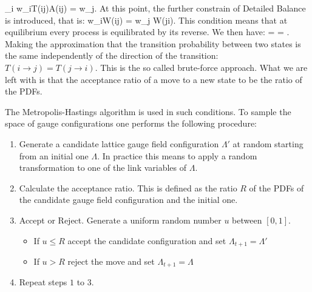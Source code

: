     \sum_i w_iT(i\rightarrow j)A(i\rightarrow j) =  w_j.
\eeq 
At this point, the further constrain of Detailed Balance \cite{robert_monte_2004} is introduced, that is:
\beq
    w_iW(i\rightarrow j) =  w_j W(j\rightarrow i).
\eeq 
This condition means that at equilibrium every process is equilibrated by its reverse. We then have:
\beq
     =  = .
\eeq
Making the approximation that the transition probability between two states is the same independently of the direction of the transition: $T(i\rightarrow j) = T(j\rightarrow i)$. This is the so called brute-force approach. What we are left with is that the acceptance ratio of a move to a new state to be the ratio of the PDFs.  

The Metropolis-Hastings algorithm is used in such conditions. To sample the space of gauge configurations one performs the following procedure:
\begin{enumerate}
    \item Generate a candidate lattice gauge field configuration $\Lambda'$ at random starting from an initial one $\Lambda$. In practice this means to apply a random transformation to one of the link variables of $\Lambda$.
    \item Calculate the acceptance ratio. This is defined as the ratio $R$ of the PDFs of the candidate gauge field configuration and the initial one.
    \item Accept or Reject. Generate a uniform random number $u$ between $[0,1]$. 
    \begin{itemize}
        \item If $u \leq R$ accept the candidate configuration and set $\Lambda_{t+1} = \Lambda'$
        \item If $u > R$ reject the move and set $\Lambda_{t+1} = \Lambda$
    \end{itemize}
    \item Repeat steps $1$ to $3$.
\end{enumerate}

